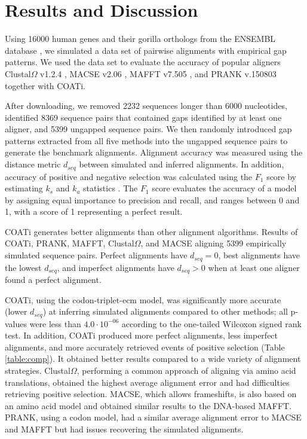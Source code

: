 \section*{Results and Discussion}
Using 16000 human genes and their gorilla orthologs from the ENSEMBL
database , we simulated a data set of pairwise
alignments with empirical gap patterns.
We used the data set to evaluate the accuracy of popular aligners
Clustal$\Omega$ v1.2.4 ,
MACSE v2.06 , MAFFT v7.505
, and PRANK v.150803 
together with COATi.

After downloading, we removed 2232 sequences longer than 6000 nucleotides, identified 8369 sequence pairs that contained gaps identified by at least one aligner, and 5399 ungapped sequence pairs.
We then randomly introduced gap patterns extracted from all five methods into the ungapped sequence pairs to generate the benchmark alignments.
Alignment accuracy was measured using the distance metric $d_{seq}$
 between simulated and inferred
alignments.
In addition, accuracy of positive and negative selection was calculated
using the $F_1$ score by estimating $k_s$ and $k_a$ statistics
.
The $F_1$ score evaluates the accuracy of a model by assigning equal importance to precision and recall, and ranges between 0 and 1, with a score of 1 representing a perfect result.

\begin{table}[!ht]
\centering

 \caption{COATi generates better alignments than other alignment algorithms. Results of COATi, PRANK, MAFFT, Clustal$\Omega$, and MACSE aligning 5399 empirically simulated sequence pairs. Perfect alignments have $d_{seq}=0$, best alignments have the lowest $d_{seq}$, and imperfect alignments have $d_{seq}>0$ when at least one aligner found a perfect alignment.}
 \label{table:comp}
\end{table}

COATi, using the codon-triplet-ecm model, was significantly more accurate (lower $d_{seq}$) at inferring simulated alignments compared to other methods; all p-values were less than $4.0 \cdot 10^{-06}$ according to the one-tailed Wilcoxon signed rank test.
In addition, COATi produced more perfect alignments, less imperfect alignments, and more accurately retrieved events of positive selection (Table \ref{table:comp}).
It obtained better results compared to a wide variety of alignment strategies.
Clustal$\Omega$, performing a common approach of aligning via amino acid translations, obtained the highest average alignment error and had difficulties retrieving positive selection.
MACSE, which allows frameshifts, is also based on an amino acid model and obtained similar results to the DNA-based MAFFT.
PRANK, using a codon model, had a similar average alignment error to MACSE and MAFFT but had issues recovering the simulated alignments.

